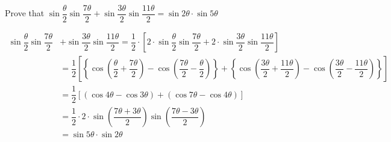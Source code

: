 
%
%
%
%
% 
% 

\question Prove that $\sin\dfrac{\theta}{2}\sin\dfrac{7\theta}{2} + 
\sin\dfrac{3\theta}{2}\sin\dfrac{11\theta}{2} = \sin 2\theta\cdot\sin 5\theta$

\insertQR{}

\ifprintanswers
\fi 

\begin{solution}
  \begin{fullwidth}
  \begin{align}
      \sin\dfrac{\theta}{2}\sin\dfrac{7\theta}{2} &+ \sin\dfrac{3\theta}{2}\sin\dfrac{11\theta}{2}
      = \dfrac{1}{2}\cdot\left[ 2\cdot\sin\dfrac{\theta}{2}\sin\dfrac{7\theta}{2} + 
         2\cdot\sin\dfrac{3\theta}{2}\sin\dfrac{11\theta}{2} \right] \\
       &= \dfrac{1}{2}\left[ \left\lbrace \cos\left( \dfrac{\theta}{2} + \dfrac{7\theta}{2}\right) 
           - \cos\left( \dfrac{7\theta}{2} - \dfrac{\theta}{2}\right)\right\rbrace
           + \left\lbrace \cos\left( \dfrac{3\theta}{2} + \dfrac{11\theta}{2}\right) 
           - \cos\left( \dfrac{3\theta}{2} - \dfrac{11\theta}{2}\right)\right\rbrace
           \right] \\
       &= \dfrac{1}{2}\left[ (\cos 4\theta - \cos 3\theta) + ( \cos 7\theta - \cos 4\theta)\right] \\
       &= \dfrac{1}{2}\cdot 2\cdot\sin\left( \dfrac{7\theta + 3\theta}{2}\right)\sin\left( \dfrac{7\theta - 3\theta}{2}\right) \\
       &= \sin 5\theta\cdot\sin 2\theta
  \end{align}
  \end{fullwidth}
\end{solution}
